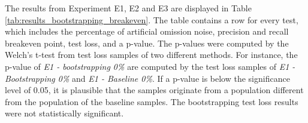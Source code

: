 The results from Experiment E1, E2 and E3 are displayed in Table \ref{tab:results_bootstrapping_breakeven}. The table contains a row for every test, which includes  the percentage of artificial omission noise, precision and recall breakeven point, test loss, and a p-value. The p-values were computed by the Welch's t-test from test loss samples of two different methods. For instance, the p-value of {\it E1 - bootstrapping 0\%} are computed by the test loss samples of {\it E1 - Bootstrapping 0\%} and {\it E1 - Baseline 0\%}.  If a p-value is below the significance level of 0.05, it is plausible that the samples originate from a population different from the population of the baseline samples. The bootstrapping test loss results were not statistically significant.\\



